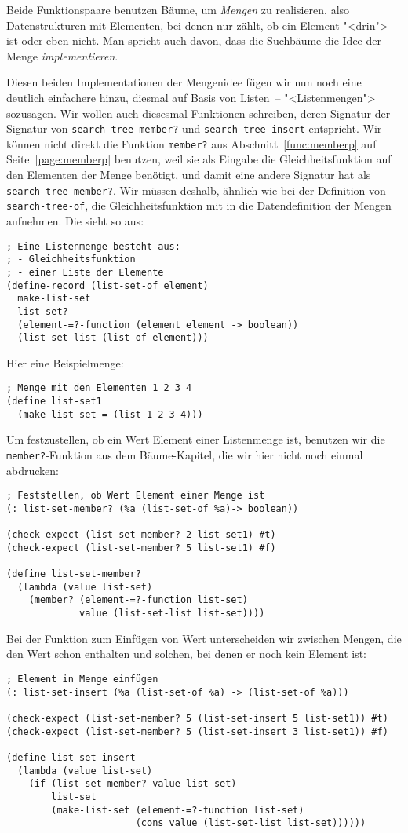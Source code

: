 Beide Funktionspaare benutzen Bäume, um \textit{Mengen}
zu realisieren, also Datenstrukturen mit Elementen, bei denen nur
zählt, ob ein Element "<drin"> ist oder eben nicht.  Man spricht auch
davon, dass die Suchbäume die Idee der Menge
\textit{implementieren}.

Diesen beiden Implementationen der Mengenidee fügen wir nun noch eine
deutlich einfachere hinzu, diesmal auf Basis von Listen~--
"<Listenmengen"> sozusagen. Wir wollen auch
diesesmal Funktionen schreiben, deren Signatur der Signatur von
\lstinline{search-tree-member?} und \lstinline{search-tree-insert}
entspricht.  Wir können nicht direkt die Funktion \lstinline{member?}
aus Abschnitt~\ref{func:memberp} auf Seite~\ref{page:memberp}
benutzen, weil sie als Eingabe die Gleichheitsfunktion auf den
Elementen der Menge benötigt, und damit eine andere Signatur hat als
\lstinline{search-tree-member?}.  Wir müssen deshalb, ähnlich wie bei
der Definition von \lstinline{search-tree-of}, die Gleichheitsfunktion
mit in die Datendefinition der Mengen aufnehmen.  Die sieht so aus:
%
\begin{lstlisting}
; Eine Listenmenge besteht aus:
; - Gleichheitsfunktion
; - einer Liste der Elemente
(define-record (list-set-of element)
  make-list-set
  list-set?
  (element-=?-function (element element -> boolean))
  (list-set-list (list-of element)))
\end{lstlisting}
%
Hier eine Beispielmenge:
%
\begin{lstlisting}
; Menge mit den Elementen 1 2 3 4
(define list-set1
  (make-list-set = (list 1 2 3 4)))
\end{lstlisting}
%
Um festzustellen, ob ein Wert Element einer Listenmenge ist, benutzen
wir die \lstinline{member?}-Funktion aus dem Bäume-Kapitel, die wir
hier nicht noch einmal abdrucken:
%
\begin{lstlisting}
; Feststellen, ob Wert Element einer Menge ist
(: list-set-member? (%a (list-set-of %a)-> boolean))

(check-expect (list-set-member? 2 list-set1) #t)
(check-expect (list-set-member? 5 list-set1) #f)

(define list-set-member?
  (lambda (value list-set)
    (member? (element-=?-function list-set)
             value (list-set-list list-set))))
\end{lstlisting}
%
Bei der Funktion zum Einfügen von Wert unterscheiden wir zwischen
Mengen, die den Wert schon enthalten und solchen, bei denen er noch
kein Element ist:
%
\begin{lstlisting}
; Element in Menge einfügen
(: list-set-insert (%a (list-set-of %a) -> (list-set-of %a)))

(check-expect (list-set-member? 5 (list-set-insert 5 list-set1)) #t)
(check-expect (list-set-member? 5 (list-set-insert 3 list-set1)) #f)

(define list-set-insert
  (lambda (value list-set)
    (if (list-set-member? value list-set)
        list-set
        (make-list-set (element-=?-function list-set)
                       (cons value (list-set-list list-set))))))
\end{lstlisting}
